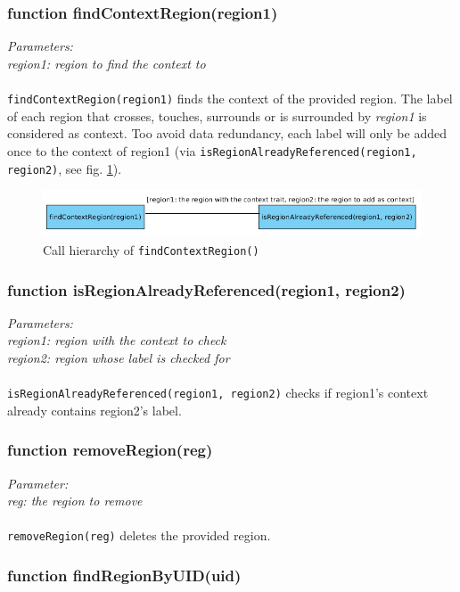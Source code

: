 \subsubsection{function findContextRegion(region1)}
\emph{Parameters:\\
	region1: region to find the context to\\ \\
}
\texttt{findContextRegion(region1)} finds the context of the provided region. The label of each region that crosses, touches, surrounds or is surrounded by \emph{region1} is considered as context. Too avoid data redundancy, each label will only be added once to the context of region1 (via \texttt{isRegionAlreadyReferenced(region1, region2)}, see fig. \ref{figB_findContext}).

\begin{figure}[H]
	\begin{center}
		\includegraphics[scale=0.4]{img/ch_findContext.png}
		\caption{Call hierarchy of \texttt{findContextRegion()}}
		\label{figB_findContext}
	\end{center}
\end{figure}


\subsubsection{function isRegionAlreadyReferenced(region1, region2)}
\emph{Parameters:\\
	region1: region with the context to check\\
	region2: region whose label is checked for\\ \\
}
\texttt{isRegionAlreadyReferenced(region1, region2)} checks if region1's context already contains region2’s label.


\subsubsection{function removeRegion(reg)}
\emph{Parameter:\\
	reg: the region to remove\\ \\
}
\texttt{removeRegion(reg)} deletes the provided region.


\subsubsection{function findRegionByUID(uid)}

